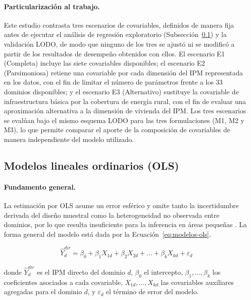 \paragraph{Particularización al trabajo.}
Este estudio contrasta tres escenarios de covariables, definidos de manera fija antes de ejecutar el análisis de regresión exploratorio (Subsección~\ref{subsec:ols}) y la validación LODO, de modo que ninguno de los tres se ajustó ni se modificó a partir de los resultados de desempeño obtenidos con ellos. El escenario E1 (Completa) incluye las siete covariables disponibles; el escenario E2 (Parsimoniosa) retiene una covariable por cada dimensión del IPM representada en los datos, con el fin de limitar el número de parámetros frente a los 33 dominios disponibles; y el escenario E3 (Alternativo) sustituye la covariable de infraestructura básica por la cobertura de energía rural, con el fin de evaluar una aproximación alternativa a la dimensión de vivienda del IPM. Los tres escenarios se evalúan bajo el mismo esquema LODO para las tres formulaciones (M1, M2 y M3), lo que permite comparar el aporte de la composición de covariables de manera independiente del modelo utilizado.

\subsection{Modelos lineales ordinarios (OLS)}
\label{subsec:ols}

\paragraph{Fundamento general.}
La estimación por OLS asume un error esférico y omite tanto la incertidumbre derivada del diseño muestral como la heterogeneidad no observada entre dominios, por lo que resulta insuficiente para la inferencia en áreas pequeñas \cite{RaoMolina_2015}. La forma general del modelo está dada por la Ecuación~\ref{eq:modelos-ols}.

\begin{equation}
    \hat{Y}_d^{dir} = \beta_0 + \beta_1 X_{1d} + \beta_2 X_{2d} + \dots + \beta_k X_{kd} + \varepsilon_d
    \label{eq:modelos-ols}
\end{equation}

\noindent donde $\hat{Y}_d^{dir}$ es el IPM directo del dominio $d$, $\beta_0$ el intercepto, $\beta_1,\dots,\beta_k$ los coeficientes asociados a cada covariable, $X_{1d},\dots,X_{kd}$ las covariables auxiliares agregadas para el dominio $d$, y $\varepsilon_d$ el término de error del modelo.

